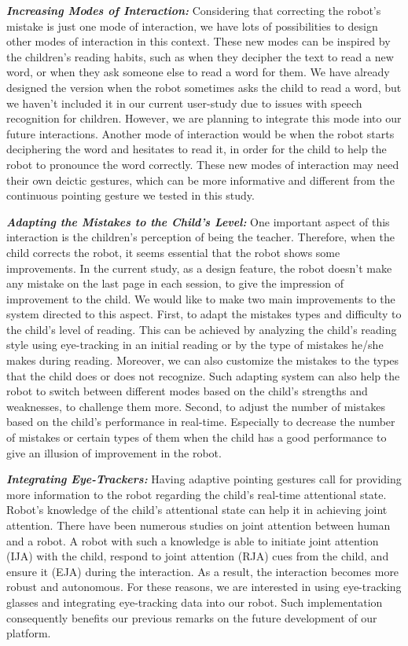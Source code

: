 \documentclass{sigchi}
\begin{document}
\textbf{\textit{Increasing Modes of Interaction:}}
Considering that correcting the robot's mistake is just one mode of interaction, we have lots of possibilities to design other modes of interaction in this context. 
These new modes can be inspired by the children's reading habits, such as when they decipher the text to read a new word, or when they ask someone else to read a word for them. 
We have already designed the version when the robot sometimes asks the child to read a word, but we haven't included it in our current user-study due to issues with speech recognition for children.
However, we are planning to integrate this mode into our future interactions. 
Another mode of interaction would be when the robot starts deciphering the word and hesitates to read it, in order for the child to help the robot to pronounce the word correctly.
These new modes of interaction may need their own deictic gestures, which can be more informative and different from the continuous pointing gesture we tested in this study. 

\textbf{\textit{Adapting the Mistakes to the Child's Level:}}
One important aspect of this interaction is the children's perception of being the teacher. Therefore, when the child corrects the robot, it seems essential that the robot shows some improvements. 
In the current study, as a design feature, the robot doesn't make any mistake on the last page in each session, to give the impression of improvement to the child.
We would like to make two main improvements to the system directed to this aspect.
First, to adapt the mistakes types and difficulty to the child's level of reading. 
This can be achieved by analyzing the child's reading style using eye-tracking in an initial reading or by the type of mistakes he/she makes during reading.
Moreover, we can also customize the mistakes to the types that the child does or does not recognize.
Such adapting system can also help the robot to switch between different modes based on the child's strengths and weaknesses, to challenge them more.
Second, to adjust the number of mistakes based on the child's performance in real-time. 
Especially to decrease the number of mistakes or certain types of them when the child has a good performance to give an illusion of improvement in the robot.

\textbf{\textit{Integrating Eye-Trackers:}}
Having adaptive pointing gestures call for providing more information to the robot regarding the child's real-time attentional state.
Robot's knowledge of the child's attentional state can help it in achieving joint attention. 
There have been numerous studies on joint attention between human and a robot.
A robot with such a knowledge is able to initiate joint attention (IJA) with the child, respond to joint attention (RJA) cues from the child, and ensure it (EJA) during the interaction.
As a result, the interaction becomes more robust and autonomous. 
For these reasons, we are interested in using eye-tracking glasses and integrating eye-tracking data into our robot. 
Such implementation consequently benefits our previous remarks on the future development of our platform.
\end{document}
